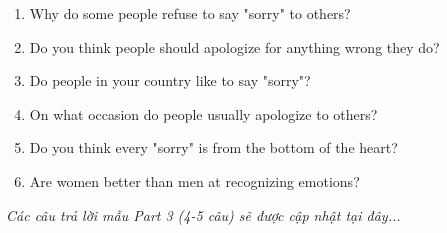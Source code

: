 \begin{ieltsprompt}
\begin{enumerate}[itemsep=4pt]
    \item Why do some people refuse to say "sorry" to others?
    \item Do you think people should apologize for anything wrong they do?
    \item Do people in your country like to say "sorry"?
    \item On what occasion do people usually apologize to others?
    \item Do you think every "sorry" is from the bottom of the heart?
    \item Are women better than men at recognizing emotions?
\end{enumerate}
\end{ieltsprompt}

\vspace{1em}
\textit{Các câu trả lời mẫu Part 3 (4-5 câu) sẽ được cập nhật tại đây...}
\vspace{2em}

